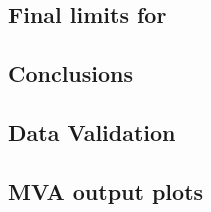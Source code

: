 \documentclass{cmspaper}
\begin{document}
     \subsection{Final limits for \lpintlumi}
    \label{app:lp_limits}
     

     \subsection{Conclusions}
     

    \subsection{Data Validation}
    \label{app:lp_postEPSdist}
    

    \subsection{MVA output plots}
    \label{app:lp_mvaplots}
    
    
    
    
    

  \clearpage

  
\end{document}

